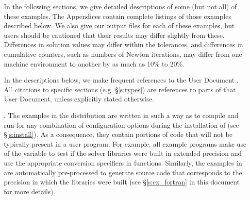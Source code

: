 \vspace{0.2in}\noindent 
In the following sections, we give detailed descriptions of some (but
not all) of these examples.  The Appendices contain complete listings
of those examples described below.  We also give our output files for
each of these examples, but users should be cautioned that their
results may differ slightly from these.  Differences in solution
values may differ within the tolerances, and differences in cumulative
counters, such as numbers of Newton iterations, may differ
from one machine environment to another by as much as 10\% to 20\%.

In the descriptions below, we make frequent references to the {\kinsol}
User Document \cite{kinsol2.2.0_ug}.  All citations to specific sections
(e.g. \S\ref{s:types}) are references to parts of that User Document, unless
explicitly stated otherwise.

\vspace{0.2in}. 
The examples in the {\kinsol} distribution are written in such a way as
to compile and run for any combination of configuration options during
the installation of {\sundials} (see \S\ref{s:install}). As a consequence,
they contain portions of code that will not be typically present in a
user program. For example, all {\C} example programs make use of the
variable  to test if the solver libraries
were built in extended precision and use the appropriate conversion 
specifiers in  functions. Similarly, the {\F} examples in
{\fkinsol} are automatically pre-processed to generate source code that
corresponds to the precision in which the {\kinsol} libraries were built
(see \S\ref{s:ex_fortran} in this document for more details).

